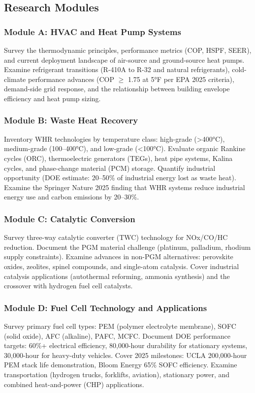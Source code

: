 \documentclass[11pt,letterpaper]{article}
\begin{document}
\subsection{Research Modules}

\subsubsection{Module A: HVAC and Heat Pump Systems}
Survey the thermodynamic principles, performance metrics (COP, HSPF, SEER), and current deployment landscape of air-source and ground-source heat pumps. Examine refrigerant transitions (R-410A to R-32 and natural refrigerants), cold-climate performance advances (COP $\geq$ 1.75 at 5°F per EPA 2025 criteria), demand-side grid response, and the relationship between building envelope efficiency and heat pump sizing.

\subsubsection{Module B: Waste Heat Recovery}
Inventory WHR technologies by temperature class: high-grade (>400°C), medium-grade (100--400°C), and low-grade (<100°C). Evaluate organic Rankine cycles (ORC), thermoelectric generators (TEGs), heat pipe systems, Kalina cycles, and phase-change material (PCM) storage. Quantify industrial opportunity (DOE estimate: 20--50\% of industrial energy lost as waste heat). Examine the Springer Nature 2025 finding that WHR systems reduce industrial energy use and carbon emissions by 20--30\%.

\subsubsection{Module C: Catalytic Conversion}
Survey three-way catalytic converter (TWC) technology for NOx/CO/HC reduction. Document the PGM material challenge (platinum, palladium, rhodium supply constraints). Examine advances in non-PGM alternatives: perovskite oxides, zeolites, spinel compounds, and single-atom catalysis. Cover industrial catalysis applications (autothermal reforming, ammonia synthesis) and the crossover with hydrogen fuel cell catalysts.

\subsubsection{Module D: Fuel Cell Technology and Applications}
Survey primary fuel cell types: PEM (polymer electrolyte membrane), SOFC (solid oxide), AFC (alkaline), PAFC, MCFC. Document DOE performance targets: 60\%+ electrical efficiency, 80,000-hour durability for stationary systems, 30,000-hour for heavy-duty vehicles. Cover 2025 milestones: UCLA 200,000-hour PEM stack life demonstration, Bloom Energy 65\% SOFC efficiency. Examine transportation (hydrogen trucks, forklifts, aviation), stationary power, and combined heat-and-power (CHP) applications.
\end{document}
